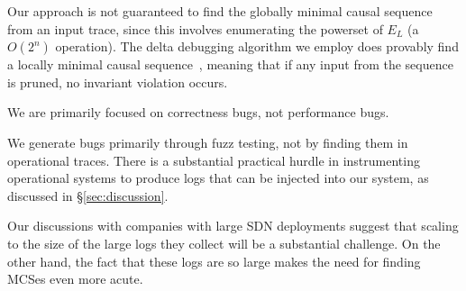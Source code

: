 Our approach is not guaranteed to find the globally minimal
causal sequence from an input trace, since this involves enumerating the powerset of
$E_L$ (a $O(2^n)$ operation).
The delta debugging algorithm we employ does provably find a
locally minimal causal sequence~\cite{Zeller:1999:YMP:318773.318946},
meaning that if any input from the sequence is pruned, no invariant violation
occurs.

We are primarily focused on correctness bugs, not performance bugs.

We generate bugs primarily through fuzz testing, not by finding them in
operational traces. There is a substantial practical hurdle in instrumenting
operational systems to produce logs that can be injected into our system, as
discussed in \S\ref{sec:discussion}.

Our discussions with companies with large SDN deployments suggest that scaling to the size of the
large logs they collect will be a substantial challenge.
On the other hand, the fact that these logs are so large makes the need for finding MCSes even more acute.


